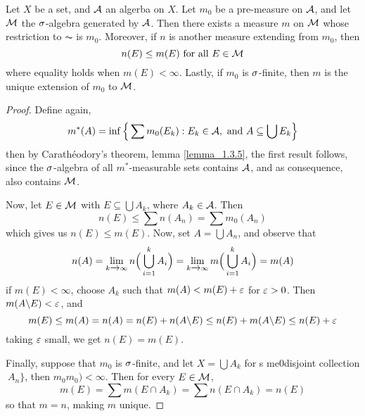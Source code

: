 \begin{theorem}\label{theorem_1.3.6}
    Let $X$ be a set, and  $\mathcal{A}$ an algerba on  $X$. Let  $m_0$ be a pre-measure
    on $\mathcal{A}$, and let  $\mathcal{M}$ the  $\sigma$-algebra generated by  $\mathcal{A}$. Then there
    exists a measure  $m$ on  $\mathcal{M}$ whose restriction to  $\AC$ is  $m_0$.
    Moreover, if $n$ is another measure extending from $m_0$, then
    \begin{equation*}
        n(E) \leq m(E) \text{ for all } E \in \mathcal{M}
    \end{equation*}
    where equality holds when $m(E)<\infty$. Lastly, if $m_0$ is $\sigma$-finite,
    then  $m$ is the unique extension of  $m_0$ to $\mathcal{M}$.
\end{theorem}
\begin{proof}
    Define again,
    \begin{equation*}
        m^\ast(A)=\inf{\Big{\{} \sum{m_0(E_k)} : E_k \in \mathcal{A}, \text{ and }
       A \subseteq \bigcup{E_k} \Big{\}}}
    \end{equation*}
    then by Carath\'eodory's theorem, lemma \ref{lemma_1.3.5}, the first result
    follows, since the $\sigma$-algebra of all  $m^\ast$-measurable sets contains
    $\mathcal{A}$, and as consequence, also contains $\mathcal{M}$.

    Now, let $E \in \mathcal{M}$ with $E \subseteq \bigcup{A_k}$, where $A_k \in \mathcal{A}$.
    Then
    \begin{equation*}
        n(E) \leq \sum{n(A_n)}=\sum{m_0(A_n)}
    \end{equation*}
    which gives us $n(E) \leq m(E)$. Now, set $A=\bigcup{A_n}$, and observe that
    \begin{equation*}
        n(A)=\lim_{k \xrightarrow{} \infty}{n\Big{(} \bigcup_{i=1}^k{A_i} \Big{)}}
        =\lim_{k \xrightarrow{} \infty}{m\Big{(} \bigcup_{i=1}^k{A_i}
        \Big{)}}=m(A)
    \end{equation*}
    if $m(E)<\infty$, choose $A_k$ such that  $m(A)<m(E)+\varepsilon$ for $\varepsilon>0$. Then
    $m(A \backslash E)<\varepsilon$, and
    \begin{equation*}
        m(E) \leq m(A)=n(A)=n(E)+n(A \backslash E) \leq n(E)+m(A \backslash E) \leq
        n(E)+\varepsilon
    \end{equation*}
    taking $\varepsilon$ small, we get $n(E)=m(E)$.

    Finally, suppose that $m_0$ is $\sigma$-finite, and let $X=\bigcup{A_k}$ for
    s me0disjoint collection $\ A_n\}$, then $ m_0 m_0)<\infty$. Then for every
    $E \in \mathcal{M}$,
    \begin{equation*}
        m(E)=\sum{m(E \cap A_k)}=\sum{n(E \cap A_k)}=n(E)
    \end{equation*}
    so that $m=n$, making $m$ unique.
\end{proof}

